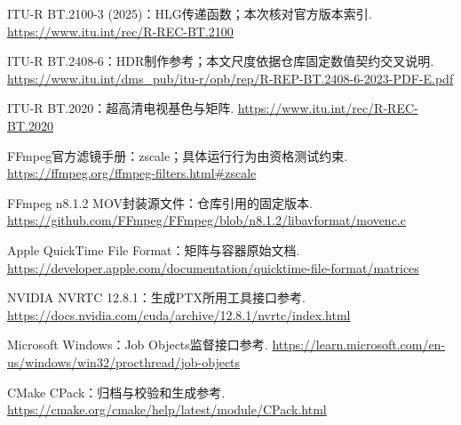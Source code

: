 \documentclass[UTF8,zihao=-4,openany]{ctexbook}
\begin{document}
\par [12] ITU-R BT.2100-3 (2025)：HLG传递函数；本次核对官方版本索引. \url{https://www.itu.int/rec/R-REC-BT.2100}\par
\par [13] ITU-R BT.2408-6：HDR制作参考；本文尺度依据仓库固定数值契约交叉说明. \url{https://www.itu.int/dms_pub/itu-r/opb/rep/R-REP-BT.2408-6-2023-PDF-E.pdf}\par
\par [14] ITU-R BT.2020：超高清电视基色与矩阵. \url{https://www.itu.int/rec/R-REC-BT.2020}\par
\par [15] FFmpeg官方滤镜手册：zscale；具体运行行为由资格测试约束. \url{https://ffmpeg.org/ffmpeg-filters.html#zscale}\par
\par [16] FFmpeg n8.1.2 MOV封装源文件：仓库引用的固定版本. \url{https://github.com/FFmpeg/FFmpeg/blob/n8.1.2/libavformat/movenc.c}\par
\par [17] Apple QuickTime File Format：矩阵与容器原始文档. \url{https://developer.apple.com/documentation/quicktime-file-format/matrices}\par
\par [18] NVIDIA NVRTC 12.8.1：生成PTX所用工具接口参考. \url{https://docs.nvidia.com/cuda/archive/12.8.1/nvrtc/index.html}\par
\par [19] Microsoft Windows：Job Objects监督接口参考. \url{https://learn.microsoft.com/en-us/windows/win32/procthread/job-objects}\par
\par [20] CMake CPack：归档与校验和生成参考. \url{https://cmake.org/cmake/help/latest/module/CPack.html}\par
\end{document}
